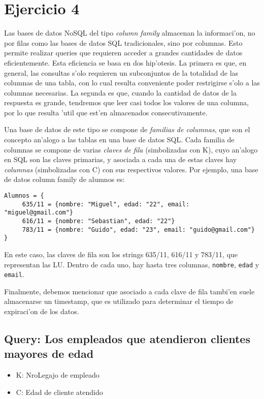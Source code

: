 \section{Ejercicio 4}

Las bases de datos NoSQL del tipo \textit{column family} almacenan la informaci'on, no por filas como las bases de datos SQL tradicionales, sino por columnas. Esto permite realizar queries que requieren acceder a grandes cantidades de datos eficientemente. Esta eficiencia se basa en dos hip'otesis. La primera es que, en general, las consultas s'olo requieren un subconjuntos de la totalidad de las columnas de una tabla, con lo cual resulta conveniente poder restrigirse s'olo a las columnas necesarias. La segunda es que, cuando la cantidad de datos de la respuesta es grande, tendremos que leer casi todos los valores de una columna, por lo que resulta 'util que est'en almacenados consecutivamente.

Una base de datos de este tipo se compone de \textit{familias de columnas}, que son el concepto an'alogo a las tablas en una base de datos SQL. Cada familia de columnas se compone de varias \textit{claves de fila} (simbolizadas con K), cuyo an'alogo en SQL son las claves primarias, y asociada a cada una de estas claves hay \textit{columnas} (simbolizadas con C) con sus respectivos valores. Por ejemplo, una base de datos column family de alumnos es:

\begin{verbatim}
Alumnos = {
     635/11 = {nombre: "Miguel", edad: "22", email: "miguel@gmail.com"}
     616/11 = {nombre: "Sebastian", edad: "22"}
     783/11 = {nombre: "Guido", edad: "23", email: "guido@gmail.com"}
}
\end{verbatim}

En este caso, las claves de fila son los strings 635/11, 616/11 y 783/11, que representan las LU. Dentro de cada uno, hay hasta tres columnas, \texttt{nombre}, \texttt{edad} y \texttt{email}.

Finalmente, debemos mencionar que asociado a cada clave de fila tambi'en suele almacenarse un timestamp, que es utilizado para determinar el tiempo de expiraci'on de los datos.

\subsection{Query: Los empleados que atendieron clientes mayores de edad}

\begin{itemize}
	\item K: NroLegajo de empleado
	\item C: Edad de cliente atendido
\end{itemize}

